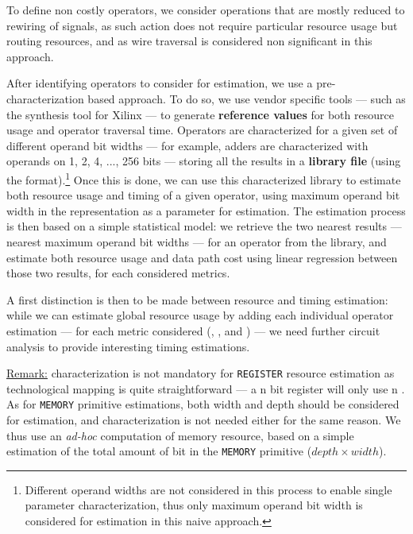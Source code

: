         To define non costly operators, we consider operations that are mostly reduced to rewiring of signals, as such action does not require particular resource usage but routing resources, and as wire traversal is considered non significant in this approach.%

        After identifying operators to consider for estimation, we use a pre-characterization based approach.
        To do so, we use vendor specific tools --- such as the \vivado{} synthesis tool for Xilinx  --- to generate {\bf reference values} for both resource usage and operator traversal time.
        Operators are characterized for a given set of different operand bit widths --- for example, adders are characterized with operands on 1, 2, 4, ..., 256 bits --- storing all the results in a {\bf library file} (using the  format).\footnote{Different operand widths are not considered in this process to enable single parameter characterization, thus only maximum operand bit width is considered for estimation in this naive approach.}
        Once this is done, we can use this characterized library to estimate both resource usage and timing of a given operator, using maximum operand bit width in the \firrtl{} representation as a parameter for estimation.
        The estimation process is then based on a simple statistical model: we retrieve the two nearest results --- \ie nearest maximum operand bit widths --- for an operator from the library, and estimate both resource usage and data path cost using linear regression between those two results, for each considered metrics.

        A first distinction is then to be made between resource and timing estimation: while we can estimate global resource usage by adding each individual operator estimation --- for each metric considered (\eg {}, ,  and ) --- we need further circuit analysis to provide interesting timing estimations.

        \underline{Remark:} characterization is not mandatory for {\tt REGISTER} resource estimation as technological mapping is quite straightforward --- a n bit register will only use n . 
        As for {\tt MEMORY} primitive estimations, both width and depth should be considered for estimation, and characterization is not needed either for the same reason.
        We thus use an {\it ad-hoc} computation of memory resource, based on a simple estimation of the total amount of bit in the {\tt MEMORY} primitive ($depth \times width$).

